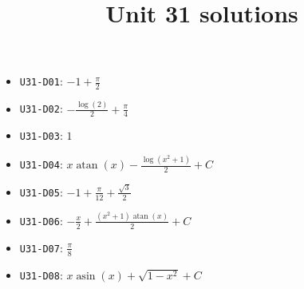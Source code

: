 \title{Unit 31 solutions}\maketitle\begin{itemize}
  \item \texttt{U31-D01}: $-1 + \frac{\pi}{2}$
  \item \texttt{U31-D02}: $- \frac{\log{\left(2 \right)}}{2} + \frac{\pi}{4}$
  \item \texttt{U31-D03}: $1$
  \item \texttt{U31-D04}: $x \operatorname{atan}{\left(x \right)} - \frac{\log{\left(x^{2} + 1 \right)}}{2}+C$
  \item \texttt{U31-D05}: $-1 + \frac{\pi}{12} + \frac{\sqrt{3}}{2}$
  \item \texttt{U31-D06}: $- \frac{x}{2} + \frac{\left(x^{2} + 1\right) \operatorname{atan}{\left(x \right)}}{2}+C$
  \item \texttt{U31-D07}: $\frac{\pi}{8}$
  \item \texttt{U31-D08}: $x \operatorname{asin}{\left(x \right)} + \sqrt{1 - x^{2}}+C$
\end{itemize}

